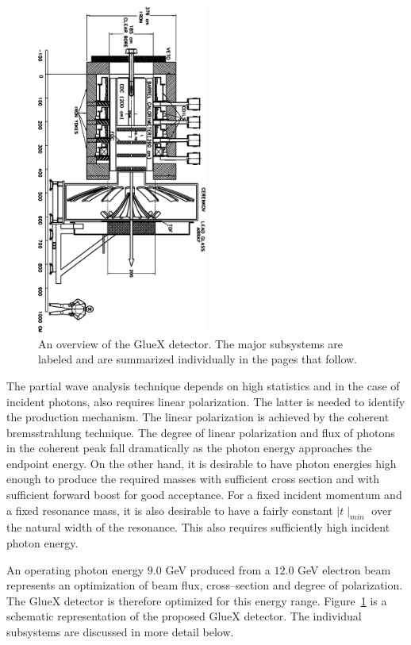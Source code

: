 \begin{figure}[t]
\centering
\includegraphics[width=0.50\textwidth,angle=90]{ch6_gluex_detector.eps}
\caption[An overview of the GlueX detector.]{\label{fig:ch6-hd_schematic}
An overview of the GlueX detector. The major subsystems are labeled and 
are summarized individually in the pages that follow. }
\end{figure}

\hspace{1cm}
The partial wave analysis technique  depends on high statistics and
in the case of incident photons, also requires linear polarization.
The latter is needed to identify the production mechanism. The linear 
polarization is achieved by the coherent bremsstrahlung technique.  
The degree of linear polarization and flux of photons in the coherent 
peak fall dramatically as the photon energy approaches
the endpoint energy.  On the other hand, it is desirable to have
photon energies high enough to produce the required masses with
sufficient cross section and with sufficient forward boost for good
acceptance. For a fixed incident momentum and a fixed resonance
mass, it is also desirable to have a fairly constant $\mid t\mid_{min}$ over
the natural width of the resonance.  This also requires sufficiently
high incident photon energy. 

\hspace{1cm}
An operating photon energy $9.0$ GeV produced from a $12.0$ GeV 
electron beam represents an optimization of beam flux, cross--section and 
degree of polarization.  The GlueX detector is therefore optimized for 
this energy range. Figure~\ref{fig:ch6-hd_schematic} is a schematic 
representation of the proposed GlueX detector. The individual 
subsystems are discussed in more detail below.


